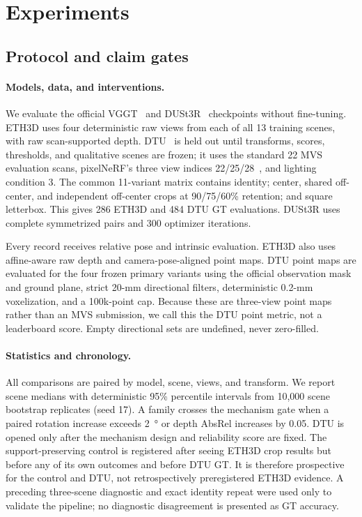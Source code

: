\section{Experiments}
\label{sec:experiments}

\subsection{Protocol and claim gates}
\paragraph{Models, data, and interventions.}
We evaluate the official VGGT~\cite{wang2025vggt} and
DUSt3R~\cite{wang2024dust3r} checkpoints without fine-tuning.  ETH3D
\cite{schops2017eth3d} uses four deterministic raw views from each of all 13
training scenes, with raw scan-supported depth.  DTU~\cite{jensen2014large} is
held out until transforms, scores, thresholds, and qualitative scenes are
frozen; it uses the standard 22 MVS evaluation scans, pixelNeRF's three view
indices 22/25/28~\cite{yu2021pixelnerf}, and lighting condition 3.  The common
11-variant matrix contains identity; center, shared off-center, and independent
off-center crops at 90/75/60\% retention; and square letterbox.  This gives 286
ETH3D and 484 DTU GT evaluations.  DUSt3R uses complete symmetrized pairs and
300 optimizer iterations.

Every record receives relative pose and intrinsic evaluation.  ETH3D also uses
affine-aware raw depth and camera-pose-aligned point maps.  DTU point maps are
evaluated for the four frozen primary variants using the official observation
mask and ground plane, strict 20-mm directional filters, deterministic 0.2-mm
voxelization, and a 100k-point cap.  Because these are three-view point maps
rather than an MVS submission, we call this the \method DTU point metric, not a
leaderboard score.  Empty directional sets are undefined, never zero-filled.

\paragraph{Statistics and chronology.}
All comparisons are paired by model, scene, views, and transform.  We report
scene medians with deterministic 95\% percentile intervals from 10,000 scene
bootstrap replicates (seed 17).  A family crosses the mechanism gate when a
paired rotation increase exceeds \SI{2}{\degree} or depth AbsRel increases by
0.05.  DTU is opened only after the mechanism design and reliability score are
fixed.  The support-preserving control is registered after seeing ETH3D crop
results but before any of its own outcomes and before DTU GT.  It is therefore
prospective for the control and DTU, not retrospectively preregistered ETH3D
evidence.  A preceding three-scene diagnostic and exact identity repeat were
used only to validate the pipeline; no diagnostic disagreement is presented as
GT accuracy.

